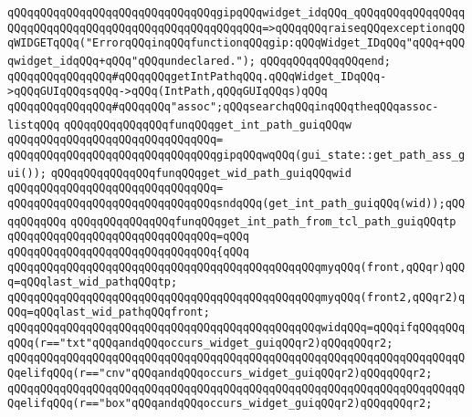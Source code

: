 \verb|qQQqqQQqqQQqqQQqqQQqqQQqqQQqqQQqgipqQQqwidget_idqQQq_qQQqqQQqqQQqqQQqqQQqqQQqqQQqqQQqqQQqqQQqqQQqqQQqqQQqqQQq=>qQQqqQQqraiseqQQqexceptionqQQqWIDGETqQQq("ErrorqQQqinqQQqfunctionqQQqgip:qQQqWidget_IDqQQq"qQQq+qQQqwidget_idqQQq+qQQq"qQQqundeclared.");|\newline
\verb|qQQqqQQqqQQqqQQqend;|\newline
\newline
\verb|qQQqqQQqqQQqqQQq#qQQqqQQqgetIntPathqQQq.qQQqWidget_IDqQQq->qQQqGUIqQQqsqQQq->qQQq(IntPath,qQQqGUIqQQqs)qQQq|\newline
\verb|qQQqqQQqqQQqqQQq#qQQqqQQq"assoc";qQQqsearchqQQqinqQQqtheqQQqassoc-listqQQq|\newline
\newline
\verb|qQQqqQQqqQQqqQQqfunqQQqget_int_path_guiqQQqw|\newline
\verb|qQQqqQQqqQQqqQQqqQQqqQQqqQQqqQQq=|\newline
\verb|qQQqqQQqqQQqqQQqqQQqqQQqqQQqqQQqgipqQQqwqQQq(gui_state::get_path_ass_gui());|\newline
\newline
\verb|qQQqqQQqqQQqqQQqfunqQQqget_wid_path_guiqQQqwid|\newline
\verb|qQQqqQQqqQQqqQQqqQQqqQQqqQQqqQQq=|\newline
\verb|qQQqqQQqqQQqqQQqqQQqqQQqqQQqqQQqsndqQQq(get_int_path_guiqQQq(wid));qQQqqQQqqQQq|\newline
\newline
\verb|qQQqqQQqqQQqqQQqfunqQQqget_int_path_from_tcl_path_guiqQQqtp|\newline
\verb|qQQqqQQqqQQqqQQqqQQqqQQqqQQqqQQq=qQQq|\newline
\verb|qQQqqQQqqQQqqQQqqQQqqQQqqQQqqQQq{qQQq|\newline
\verb|qQQqqQQqqQQqqQQqqQQqqQQqqQQqqQQqqQQqqQQqqQQqqQQqmyqQQq(front,qQQqr)qQQq=qQQqlast_wid_pathqQQqtp;|\newline
\verb|qQQqqQQqqQQqqQQqqQQqqQQqqQQqqQQqqQQqqQQqqQQqqQQqmyqQQq(front2,qQQqr2)qQQq=qQQqlast_wid_pathqQQqfront;|\newline
\newline
\verb|qQQqqQQqqQQqqQQqqQQqqQQqqQQqqQQqqQQqqQQqqQQqqQQqwidqQQq=qQQqifqQQqqQQqqQQq(r=="txt"qQQqandqQQqoccurs_widget_guiqQQqr2)qQQqqQQqr2;|\newline
\verb|qQQqqQQqqQQqqQQqqQQqqQQqqQQqqQQqqQQqqQQqqQQqqQQqqQQqqQQqqQQqqQQqqQQqqQQqelifqQQq(r=="cnv"qQQqandqQQqoccurs_widget_guiqQQqr2)qQQqqQQqr2;|\newline
\verb|qQQqqQQqqQQqqQQqqQQqqQQqqQQqqQQqqQQqqQQqqQQqqQQqqQQqqQQqqQQqqQQqqQQqqQQqelifqQQq(r=="box"qQQqandqQQqoccurs_widget_guiqQQqr2)qQQqqQQqr2;|\newline
